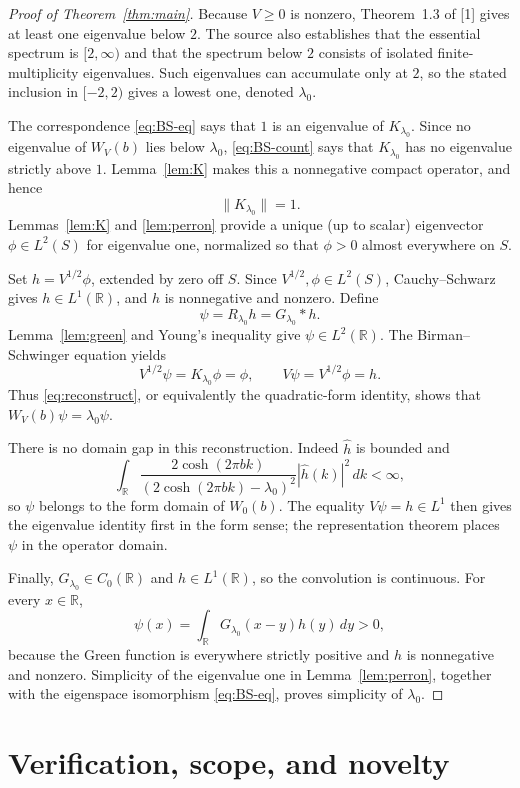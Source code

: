 \documentclass[11pt]{article}
\newcommand{\R}{\mathbb R}
\begin{document}
\begin{proof}[Proof of Theorem~\ref{thm:main}]
Because $V\ge0$ is nonzero, Theorem~1.3 of [1] gives at least one
eigenvalue below $2$.  The source also establishes that the essential spectrum
is $[2,\infty)$ and that the spectrum below $2$ consists of isolated
finite-multiplicity eigenvalues.  Such eigenvalues can accumulate only at
$2$, so the stated inclusion in $[-2,2)$ gives a lowest one, denoted
$\lambda_0$.

The correspondence \eqref{eq:BS-eq} says that $1$ is an eigenvalue of
$K_{\lambda_0}$.  Since no eigenvalue of $W_V(b)$ lies below $\lambda_0$,
\eqref{eq:BS-count} says that $K_{\lambda_0}$ has no eigenvalue strictly above
$1$.  Lemma~\ref{lem:K} makes this a nonnegative compact operator, and hence
\[
 \|K_{\lambda_0}\|=1.
\]
Lemmas~\ref{lem:K} and \ref{lem:perron} provide a unique (up to scalar)
eigenvector $\phi\in L^2(S)$ for eigenvalue one, normalized so that
$\phi>0$ almost everywhere on $S$.

Set $h=V^{1/2}\phi$, extended by zero off $S$.  Since
$V^{1/2},\phi\in L^2(S)$, Cauchy--Schwarz gives $h\in L^1(\R)$, and $h$ is
nonnegative and nonzero.  Define
\[
 \psi=R_{\lambda_0}h=G_{\lambda_0}*h.
\]
Lemma~\ref{lem:green} and Young's inequality give $\psi\in L^2(\R)$.  The
Birman--Schwinger equation yields
\[
 V^{1/2}\psi=K_{\lambda_0}\phi=\phi,
 \qquad V\psi=V^{1/2}\phi=h.
\]
Thus \eqref{eq:reconstruct}, or equivalently the quadratic-form identity,
shows that $W_V(b)\psi=\lambda_0\psi$.

There is no domain gap in this reconstruction.  Indeed $\widehat h$ is
bounded and
\[
 \int_\R
 \frac{2\cosh(2\pi bk)}{(2\cosh(2\pi bk)-\lambda_0)^2}
 |\widehat h(k)|^2\,dk<\infty,
\]
so $\psi$ belongs to the form domain of $W_0(b)$.  The equality
$V\psi=h\in L^1$ then gives the eigenvalue identity first in the form sense;
the representation theorem places $\psi$ in the operator domain.

Finally, $G_{\lambda_0}\in C_0(\R)$ and $h\in L^1(\R)$, so the convolution
is continuous.  For every $x\in\R$,
\[
 \psi(x)=\int_\R G_{\lambda_0}(x-y)h(y)\,dy>0,
\]
because the Green function is everywhere strictly positive and $h$ is
nonnegative and nonzero.  Simplicity of the eigenvalue one in
Lemma~\ref{lem:perron}, together with the eigenspace isomorphism
\eqref{eq:BS-eq}, proves simplicity of $\lambda_0$.
\end{proof}

\section{Verification, scope, and novelty}
\end{document}
